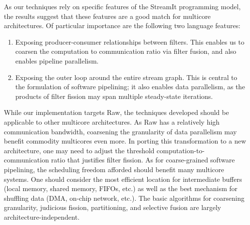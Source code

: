 As our techniques rely on specific features of the StreamIt
programming model, the results suggest that these features are a good
match for multicore architectures.  Of particular importance are the
following two language features:
\begin{enumerate}
\item Exposing producer-consumer relationships between filters.  This
enables us to coarsen the computation to communication ratio via
filter fusion, and also enables pipeline parallelism.

\item Exposing the outer loop around the entire stream graph.  This is
central to the formulation of software pipelining; it also enables
data parallelism, as the products of filter fission may span multiple
steady-state iterations.
\end{enumerate}

While our implementation targets Raw, the techniques developed should
be applicable to other multicore architectures.  As Raw has a
relatively high communication bandwidth, coarsening the granularity of
data parallelism may benefit commodity multicores even more.  In
porting this transformation to a new architecture, one may need to
adjust the threshold computation-to-communication ratio that justifies
filter fission.  As for coarse-grained software pipelining, the
scheduling freedom afforded should benefit many multicore systems.
One should consider the most efficient location for intermediate
buffers (local memory, shared memory, FIFOs, etc.) as well as the best
mechanism for shuffling data (DMA, on-chip network, etc.).  The basic
algorithms for coarsening granularity, judicious fission,
partitioning, and selective fusion are largely
architecture-independent.
